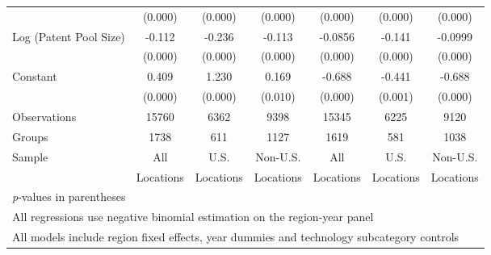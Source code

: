 \begin{table}[htbp]
\begin{tabular}{l*{6}{c}}
                &  (0.000)&  (0.000)&  (0.000)&  (0.000)&  (0.000)&  (0.000)\\
Log (Patent Pool Size)&   -0.112&   -0.236&   -0.113&  -0.0856&   -0.141&  -0.0999\\
                &  (0.000)&  (0.000)&  (0.000)&  (0.000)&  (0.000)&  (0.000)\\
Constant        &    0.409&    1.230&    0.169&   -0.688&   -0.441&   -0.688\\
                &  (0.000)&  (0.000)&  (0.010)&  (0.000)&  (0.001)&  (0.000)\\
\hline
Observations    &    15760&     6362&     9398&    15345&     6225&     9120\\
Groups          &     1738&      611&     1127&     1619&      581&     1038\\
Sample&All &U.S. &Non-U.S.&All &U.S. &Non-U.S. \\
          &Locations &Locations&Locations&Locations &Locations&Locations \\
\hline\hline
\multicolumn{7}{l}{\footnotesize \textit{p}-values in parentheses}\\
\multicolumn{7}{l}{\footnotesize All regressions use negative binomial estimation on the region-year panel}\\
\multicolumn{7}{l}{\footnotesize All models include region fixed effects, year dummies and technology subcategory controls}\\
\end{tabular}
\end{table}
